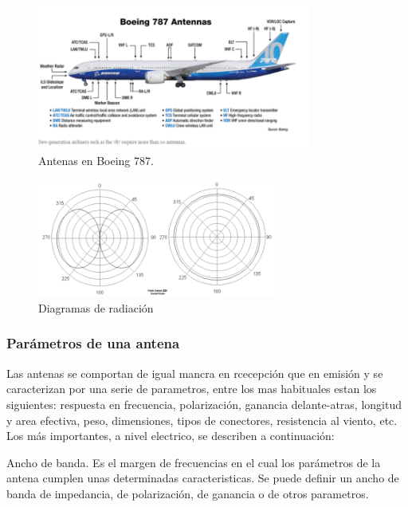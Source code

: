   \begin{figure}[!h]
    \centering
  \includegraphics[width=0.8\textwidth]{06.radionavegacion/Imagenes/06.00.ondas.electromagneticas/787-antenas.png}  
    \caption{Antenas en Boeing 787. \protect\cite{Boeing787_antenas}}
      \label{fig:06.antenas.boeing.787}
  \end{figure}



\begin{figure}[!h]
  \centering
  \includegraphics[width=0.7\textwidth]{06.radionavegacion/Imagenes/06.01.adf/diagramas-radiacion.png}
  \caption{Diagramas de radiaci\'on \protect\cite{wikipedia_esp}}
  \label{fig:diagramas-radiacion}
\end{figure}

\subsubsection{Parámetros de una antena}
\label{sec:Parametros.antena}


Las antenas se comportan de igual mancra en rcecepción que en emisión y se caracterizan por una serie de parametros,
entre los mas habituales estan los siguientes:
respuesta en frecuencia,
polarización,
ganancia delante-atras,
longitud y area efectiva,
peso,
dimensiones,
tipos de conectores,
resistencia al viento, etc. \cite{moyacomunicaciones}
Los más importantes, a nivel electrico, se describen a continuación:

Ancho de banda. Es el margen de frecuencias en el cual los parámetros de la antena cumplen unas determinadas caracteristicas. Se puede deﬁnir un ancho de banda de impedancia, de polarización, de ganancia o de otros parametros.

